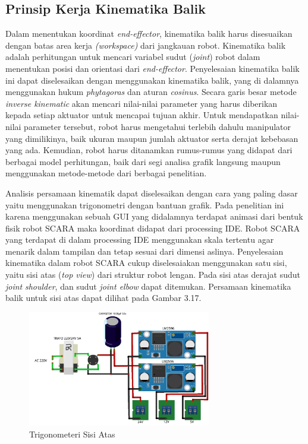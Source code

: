 \subsection{Prinsip Kerja Kinematika Balik}
Dalam menentukan koordinat \textit{end-effector}, kinematika balik harus disesuaikan dengan batas area kerja \textit{(workspace)} dari jangkauan robot. Kinematika balik adalah perhitungan untuk mencari variabel sudut (\textit{joint}) robot dalam menentukan posisi dan orientasi dari \textit{end-effector}. Penyelesaian kinematika balik ini dapat diselesaikan dengan menggunakan kinematika balik, yang di dalamnya menggunakan hukum \textit{phytagoras} dan aturan \textit{cosinus}. 
Secara garis besar metode \textit{inverse kinematic} akan mencari nilai-nilai parameter yang harus diberikan kepada setiap aktuator untuk mencapai tujuan akhir. Untuk mendapatkan nilai-nilai parameter tersebut, robot harus mengetahui terlebih dahulu manipulator yang dimilikinya, baik ukuran maupun jumlah aktuator serta derajat kebebasan yang ada. Kemudian, robot harus ditanamkan rumus-rumus yang didapat dari berbagai model perhitungan, baik dari segi analisa grafik langsung maupun menggunakan metode-metode dari berbagai penelitian. 

Analisis persamaan kinematik dapat diselesaikan dengan cara yang paling dasar yaitu menggunakan trigonometri dengan bantuan grafik. Pada penelitian ini karena menggunakan sebuah GUI yang didalamnya terdapat animasi dari bentuk fisik robot SCARA maka koordinat didapat dari processing IDE. Robot SCARA yang terdapat di dalam processing IDE menggunakan skala tertentu agar menarik dalam tampilan dan tetap sesuai dari dimensi aslinya. Penyelesaian kinematika dalam robot SCARA cukup diselesaiakan menggunakan satu sisi, yaitu sisi atas (\textit{top view}) dari struktur robot lengan. Pada sisi atas derajat sudut \textit{joint} \textit{shoulder}, dan sudut \textit{joint elbow} dapat ditemukan. Persamaan kinematika balik untuk sisi atas dapat dilihat pada Gambar 3.17.
\begin{figure}[H]
	\centering
	\includegraphics[width=8cm]{gambar/catudaya_bb.png}
	\caption{Trigonometeri Sisi Atas}
	\label{g_ik}
\end{figure}
 
